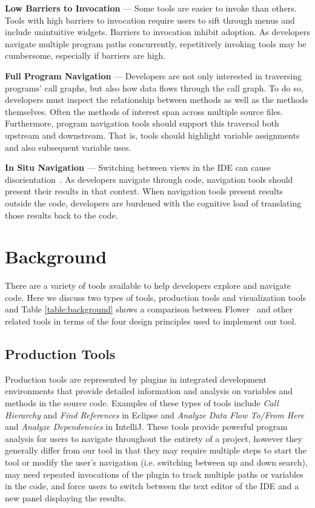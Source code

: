 \documentclass[conference]{IEEEtran}
\newcommand{\toolName}{Flower}
\begin{document}
\vspace{1em} 
\noindent\textbf{Low Barriers to Invocation} ---
Some tools are easier to invoke than others. 
Tools with high barriers to invocation require users to sift through menus and include unintuitive widgets. 
Barriers to invocation inhibit adoption. 
As developers navigate multiple program paths concurrently, repetitively invoking tools may be cumbersome, especially if barriers are high. 


\vspace{1em} 
\noindent\textbf{Full Program Navigation}  ---
Developers are not only interested in traversing programs' call graphs, but also how data flows through the call graph.
To do so, developers must inspect the relationship between methods as well as the methods themselves.
Often the methods of interest span across multiple source files.
Furthermore, program navigation tools should support this traversal both upstream and downstream. 
That is, tools should highlight variable assignments and also subsequent variable uses. 

\vspace{1em} 
\noindent\textbf{In Situ Navigation}  ---
Switching between views in the IDE can cause disorientation~\cite{deAlwis2006disorient}. As developers navigate through code, navigation tools should present their results in that context. 
When navigation tools present results outside the code, developers are burdened with the cognitive load of translating those results back to the code.

\section{Background}
There are a variety of tools available to help developers explore and navigate code. Here we discuss two types of tools, production tools and visualization tools and Table \ref{table:background} shows a comparison between \toolName~ and other related tools in terms of the four design principles used to implement our tool.

\subsection{Production Tools}
Production tools are represented by plugins in integrated development environments that provide detailed information and analysis on variables and methods in the source code. Examples of these types of tools include \emph{Call Hierarchy} and \emph{Find References} in Eclipse\cite{Eclipse} and \emph{Analyze Data Flow To/From Here} and \emph{Analyze Dependencies} in IntelliJ\cite{IntelliJ}. These tools provide powerful program analysis for users to navigate throughout the entirety of a project, however they generally differ from our tool in that they may require multiple steps to start the tool or modify the user's navigation (i.e. switching between up and down search), may need repeated invocations of the plugin to track multiple paths or variables in the code, and force users to switch between the text editor of the IDE and a new panel displaying the results.
\end{document}
